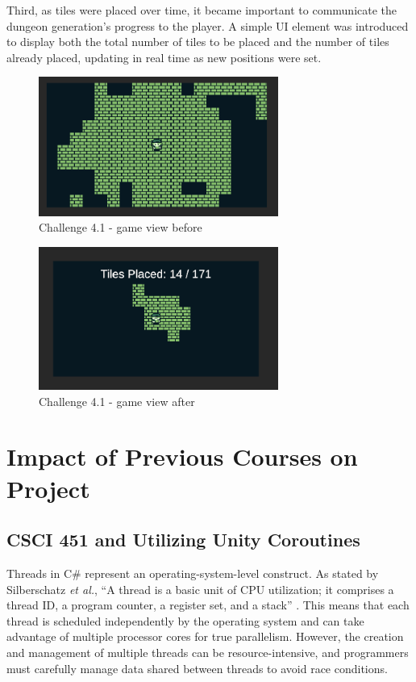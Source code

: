\documentclass[a4paper, 12pt, one column, aas_macros]{article}
\begin{document}
Third, as tiles were placed over time, it became important to communicate the dungeon generation's progress to the player. A simple UI element was introduced to display both the total number of tiles to be placed and the number of tiles already placed, updating in real time as new positions were set.

\begin{figure}[htbp]
  \centering
  \includegraphics[width=0.7\textwidth]{images/difficulty-1-before.png}
  \caption{Challenge 4.1 - game view before}
  \label{fig:difficulty-1-before}
\end{figure}

\begin{figure}[htbp]
  \centering
  \includegraphics[width=0.7\textwidth]{images/difficulty-1-after.png}
  \caption{Challenge 4.1 - game view after}
  \label{fig:difficulty-1-after}
\end{figure}

\section{Impact of Previous Courses on Project}
\subsection{CSCI 451 and Utilizing Unity Coroutines}
Threads in C\# represent an operating-system-level construct. As stated by Silberschatz \emph{et al.}, ``A thread is a basic unit of CPU utilization; it comprises a thread ID, a program counter, a register set, and a stack'' \cite{silberschatz}. This means that each thread is scheduled independently by the operating system and can take advantage of multiple processor cores for true parallelism. However, the creation and management of multiple threads can be resource-intensive, and programmers must carefully manage data shared between threads to avoid race conditions. 
\end{document}
